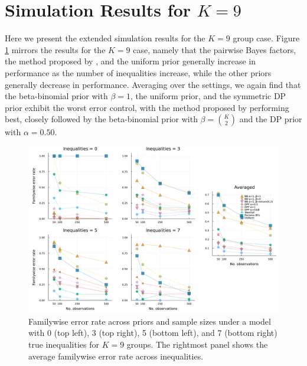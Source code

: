 \documentclass[11pt,a4paper]{article}
\theoremstyle{definition} %
\theoremstyle{case}
\begin{document}
\section{Simulation Results for $K = 9$} \label{app:simulation}
Here we present the extended simulation results for the $K = 9$ group case. Figure \ref{fig:big_simulation-k9-I} mirrors the results for the $K = 9$ case, namely that the pairwise Bayes factors, the method proposed by \textcite{westfall1997bayesian}, and the uniform prior generally increase in performance as the number of inequalities increase, while the other priors generally decrease in performance. Averaging over the settings, we again find that the beta-binomial prior with $\beta = 1$, the uniform prior, and the symmetric DP prior exhibit the worst error control, with the method proposed by \textcite{westfall1997bayesian} performing best, closely followed by the beta-binomial prior with $\beta = {K \choose 2}$ and the DP prior with $\alpha = 0.50$.

\begin{figure}[!h]
    \centering
    \includegraphics[width=1\textwidth]{figures/subset_k_9_alpha_familywise.pdf}
    \caption{Familywise error rate across priors and sample sizes under a model with 0 (top left), 3 (top right), 5 (bottom left), and 7 (bottom right) true inequalities for $K = 9$ groups. The rightmost panel shows the average familywise error rate across inequalities.}
    \label{fig:big_simulation-k9-I}
\end{figure}
\end{document}
